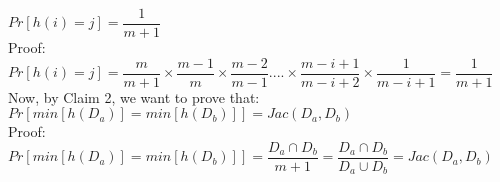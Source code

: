 \documentclass{article}
\begin{document}
$Pr[h(i) = j] = \dfrac{1}{m+1}$\\

Proof:\\

$Pr[h(i) = j] = \dfrac{m}{m+1} \times  \dfrac{m-1}{m}  \times  \dfrac{m-2}{m-1} ....  \times  \dfrac{m-i+1}{m-i+2} \times  \dfrac{1}{m-i+1} = \dfrac{1}{m+1}$\\

Now, by Claim 2, we want to prove that:\\

$Pr[min[h(D_{a})] = min[h(D_{b})]] = Jac(D_{a}, D_{b})$\\

Proof:\\

$Pr[min[h(D_{a})] = min[h(D_{b})]] = \dfrac{D_{a} \cap D_{b}}{m+1} = \dfrac{D_{a} \cap D_{b}}{D_{a} \cup D_{b}} = Jac(D_{a}, D_{b})$
\end{document}
